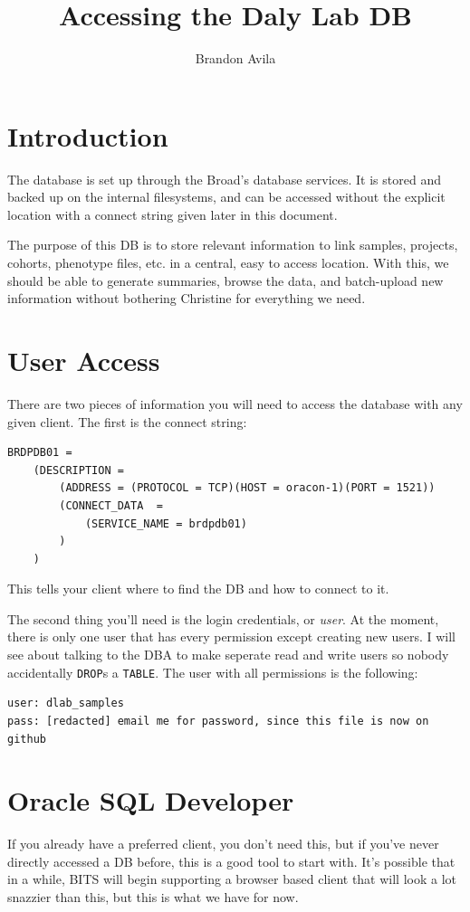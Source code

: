 \documentclass[11pt]{article} %
\title{Accessing the Daly Lab DB}
\author{Brandon Avila}
\begin{document}
\maketitle
{}

\section{Introduction}
The database is set up through the Broad's database services. It is stored and backed up on the internal filesystems, and can be accessed without the explicit location with a connect string given later in this document.

The purpose of this DB is to store relevant information to link samples, projects, cohorts, phenotype files, etc. in a central, easy to access location. With this, we should be able to generate summaries, browse the data, and batch-upload new information without bothering Christine for everything we need.

\section{User Access}
There are two pieces of information you will need to access the database with any given client. The first is the connect string:
\begin{verbatim}
BRDPDB01 =
    (DESCRIPTION =
        (ADDRESS = (PROTOCOL = TCP)(HOST = oracon-1)(PORT = 1521))
        (CONNECT_DATA  =
            (SERVICE_NAME = brdpdb01)
        )
    )
\end{verbatim}
This tells your client where to find the DB and how to connect to it.

The second thing you'll need is the login credentials, or \emph{user}. At the moment, there is only one user that has every permission except creating new users. I will see about talking to the DBA to make seperate read and write users so nobody accidentally \texttt{DROP}s a \texttt{TABLE}. The user with all permissions is the following:
\begin{verbatim}
user: dlab_samples
pass: [redacted] email me for password, since this file is now on github
\end{verbatim}

\section{Oracle SQL Developer}
If you already have a preferred client, you don't need this, but if you've never directly accessed a DB before, this is a good tool to start with. It's possible that in a while, BITS will begin supporting a browser based client that will look a lot snazzier than this, but this is what we have for now.
\end{document}
